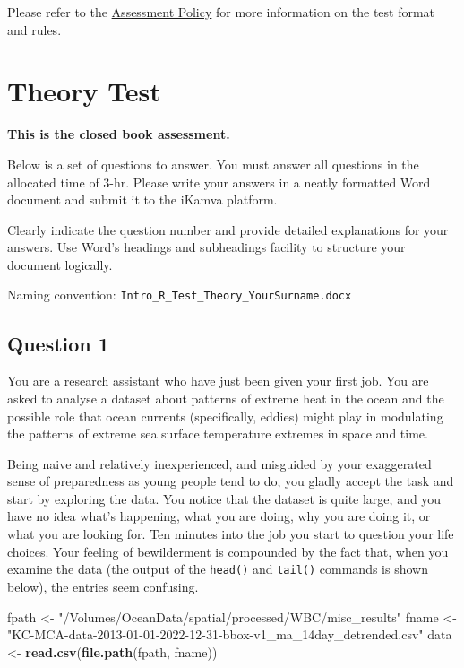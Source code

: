 \documentclass[
  10t,
]{article}
\newenvironment{Shaded}{\begin{snugshade}}{\end{snugshade}}
\newcommand{\FunctionTok}[1]{\textcolor[rgb]{0.13,0.29,0.53}{\textbf{#1}}}
\newcommand{\NormalTok}[1]{#1}
\newcommand{\OtherTok}[1]{\textcolor[rgb]{0.56,0.35,0.01}{#1}}
\newcommand{\StringTok}[1]{\textcolor[rgb]{0.31,0.60,0.02}{#1}}
\let\oldtexttt\texttt
\renewcommand{\texttt}[1]{\oldtexttt{\small #1}}
\begin{document}
Please refer to the
\href{https://tangledbank.netlify.app/BCB744/BCB744_index.html\#sec-policy}{Assessment
Policy} for more information on the test format and rules.

\section{Theory Test}\label{theory-test}

{\textbf{This is the closed book assessment.}}

Below is a set of questions to answer. You must answer all questions in
the allocated time of 3-hr. Please write your answers in a neatly
formatted Word document and submit it to the iKamva platform.

Clearly indicate the question number and provide detailed explanations
for your answers. Use Word's headings and subheadings facility to
structure your document logically.

Naming convention: \texttt{Intro\_R\_Test\_Theory\_YourSurname.docx}

\subsection{Question 1}\label{question-1}

You are a research assistant who have just been given your first job.
You are asked to analyse a dataset about patterns of extreme heat in the
ocean and the possible role that ocean currents (specifically, eddies)
might play in modulating the patterns of extreme sea surface temperature
extremes in space and time.

Being naive and relatively inexperienced, and misguided by your
exaggerated sense of preparedness as young people tend to do, you gladly
accept the task and start by exploring the data. You notice that the
dataset is quite large, and you have no idea what's happening, what you
are doing, why you are doing it, or what you are looking for. Ten
minutes into the job you start to question your life choices. Your
feeling of bewilderment is compounded by the fact that, when you examine
the data (the output of the \texttt{head()} and \texttt{tail()} commands
is shown below), the entries seem confusing.

\begin{Shaded}
\begin{Highlighting}[]
\NormalTok{fpath }\OtherTok{\textless{}{-}} \StringTok{"/Volumes/OceanData/spatial/processed/WBC/misc\_results"}
\NormalTok{fname }\OtherTok{\textless{}{-}} \StringTok{"KC{-}MCA{-}data{-}2013{-}01{-}01{-}2022{-}12{-}31{-}bbox{-}v1\_ma\_14day\_detrended.csv"}
\NormalTok{data }\OtherTok{\textless{}{-}} \FunctionTok{read.csv}\NormalTok{(}\FunctionTok{file.path}\NormalTok{(fpath, fname))}
\end{Highlighting}
\end{Shaded}
\end{document}
